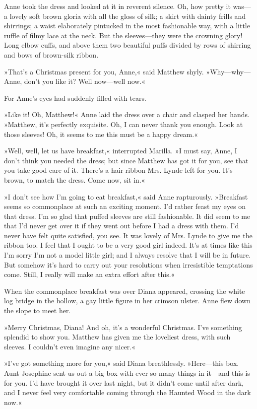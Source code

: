 Anne took the dress and looked at it in reverent silence. Oh, how pretty it was—a lovely soft brown gloria with all the gloss of silk; a skirt with dainty frills and shirrings; a waist elaborately pintucked in the most fashionable way, with a little ruffle of filmy lace at the neck. But the sleeves—they were the crowning glory! Long elbow cuffs, and above them two beautiful puffs divided by rows of shirring and bows of brown-silk ribbon.

»That's a Christmas present for you, Anne,« said Matthew shyly. »Why—why—Anne, don't you like it? Well now—well now.«

For Anne's eyes had suddenly filled with tears.

»Like it! Oh, Matthew!« Anne laid the dress over a chair and clasped her hands. »Matthew, it's perfectly exquisite. Oh, I can never thank you enough. Look at those sleeves! Oh, it seems to me this must be a happy dream.«

»Well, well, let us have breakfast,« interrupted Marilla. »I must say, Anne, I don't think you needed the dress; but since Matthew has got it for you, see that you take good care of it. There's a hair ribbon Mrs. Lynde left for you. It's brown, to match the dress. Come now, sit in.«

»I don't see how I'm going to eat breakfast,« said Anne rapturously. »Breakfast seems so commonplace at such an exciting moment. I'd rather feast my eyes on that dress. I'm so glad that puffed sleeves are still fashionable. It did seem to me that I'd never get over it if they went out before I had a dress with them. I'd never have felt quite satisfied, you see. It was lovely of Mrs. Lynde to give me the ribbon too. I feel that I ought to be a very good girl indeed. It's at times like this I'm sorry I'm not a model little girl; and I always resolve that I will be in future. But somehow it's hard to carry out your resolutions when irresistible temptations come. Still, I really will make an extra effort after this.«

When the commonplace breakfast was over Diana appeared, crossing the white log bridge in the hollow, a gay little figure in her crimson ulster. Anne flew down the slope to meet her.

»Merry Christmas, Diana! And oh, it's a wonderful Christmas. I've something splendid to show you. Matthew has given me the loveliest dress, with such sleeves. I couldn't even imagine any nicer.«

»I've got something more for you,« said Diana breathlessly. »Here—this box. Aunt Josephine sent us out a big box with ever so many things in it—and this is for you. I'd have brought it over last night, but it didn't come until after dark, and I never feel very comfortable coming through the Haunted Wood in the dark now.«


